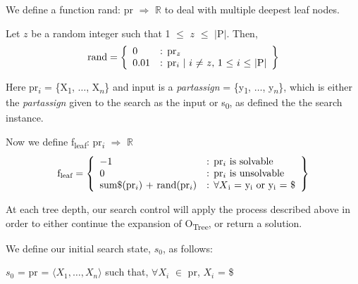 \documentclass[11pt, oneside]{article}   	%
\newenvironment{cmr}{\fontfamily{cmr}\selectfont}{\par}
\begin{document}
\begin{cmr}
\noindent We define a function rand: pr $\Rightarrow$ $\mathbb{R}$ to deal with multiple deepest leaf nodes.

\noindent Let $z$ be a random integer such that 1 $\leq$ $z$ $\leq$ $\vert$P$\vert$. Then,\\
 
     \[
         \text{rand} = \left\{\begin{array}{ll}
             0 & \text{: pr\textsubscript{$z$}}\\
             0.01 & \text{: pr\textsubscript{$i$} $\vert$ $i$ $\neq$ $z$, 1 $\leq$ $i$ $\leq$ $\vert$P$\vert$}\\
             \end{array}\right\}
       \]


\end{cmr}

\noindent Here  pr\textsubscript{$i$} = \{X\textsubscript{1}, $\dots$, X\textsubscript{$n$}\} and input is a \textit {partassign} = \{y\textsubscript{1}, $\dots$, y\textsubscript{$n$}\}, which is either the \textit{partassign} given to the search as the input or s\textsubscript{0}, as defined the the search instance.

\noindent Now we define f\textsubscript{leaf}: pr\textsubscript{$i$} $\Rightarrow$ $\mathbb{R}$\\
    \[
        \text{f\textsubscript{leaf}} = \left\{\begin{array}{ll}
            -1 & \text{: pr\textsubscript{$i$} is solvable}\\
            0 & \text{: pr\textsubscript{$i$} is unsolvable}\\
            \text{sum$\$$(pr\textsubscript{$i$}) + rand(pr\textsubscript{$i$})} & \text{: $\forall X\textsubscript{i}$ = y\textsubscript{i} or y\textsubscript{i} = \$}
            \end{array}\right\}
      \]

\begin{cmr}
\noindent At each tree depth, our search control will apply the process described above in order to either continue the expansion of O\textsubscript{Tree}, or return a solution.
\end{cmr}


\noindent We define our initial search state, $s_0$, as follows:

\noindent \centerline{$s_0$ = pr = $\langle X_1, \dots, X_n\rangle$ such that, $\forall X_i$ $\in$ pr, $X_i$ = \$}
\end{document}
